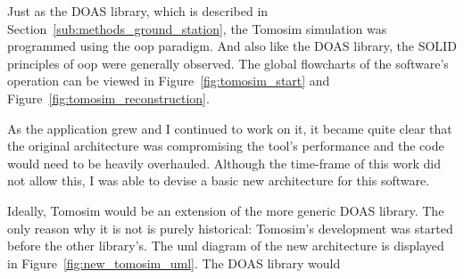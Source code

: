 


Just as the \gls{DOAS} library, which is described in
Section~\ref{sub:methods_ground_station}, the Tomosim simulation was
programmed using the \gls{oop} paradigm. And also like the \gls{DOAS}
library, the SOLID principles of \gls{oop} were generally observed. The
global flowcharts of the software's operation can be viewed in
Figure~\ref{fig:tomosim_start} and
Figure~\ref{fig:tomosim_reconstruction}. 

As the application grew and I continued to work on it, it became quite
clear that the original architecture was compromising the tool's
performance and the code would need to be heavily overhauled. Although
the time-frame of this work did not allow this, I was able to devise a
basic new architecture for this software. 

Ideally, Tomosim would be an extension of the more generic \gls{DOAS}
library. The only reason why it is not is purely historical: Tomosim's
development was started before the other library's. The \gls{uml}
diagram of the new architecture is displayed in
Figure~\ref{fig:new_tomosim_uml}. The \gls{DOAS} library would 

